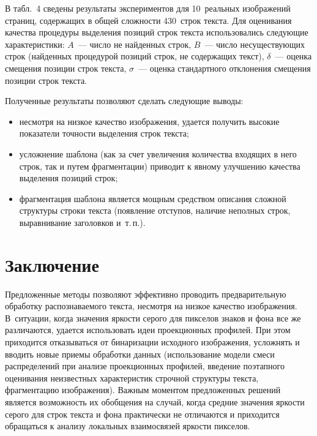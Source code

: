 \begin{multicols}{2}
      В табл.~4 сведены результаты экспериментов для 10~реальных изображений 
страниц, содержащих в общей сложности 430~строк текста. Для оценивания качества 
процедуры выделения позиций строк текста использовались следующие характеристики: 
$A$~--- число не найденных строк, $B$~--- число несуществующих строк (найденных 
процедурой позиций строк, не содержащих текст), $\delta$~--- оценка смещения позиции 
строк текста, $\sigma$~--- оценка стандартного отклонения смещения позиции строк 
текста. 
      
      Полученные результаты позволяют сделать следующие выводы:
      \begin{itemize}
\item несмотря на низкое качество изображения, удается получить высокие показатели 
точности выделения строк текста;
\item усложнение шаблона (как за счет увеличения количества входящих в него строк, 
так и путем фрагментации) приводит к явному улучшению качества выделения 
позиций строк;
\item фрагментация шаблона является мощным средством описания сложной 
структуры строки текста (появление отступов, наличие неполных строк, выравнивание 
заголовков и~т.\,п.).
\end{itemize}


\section{Заключение}
      
      Предложенные методы позволяют эффективно проводить предварительную 
обработку распознаваемого текста, несмотря на низкое качество изображения. 
В~ситуации, когда значения яркости серого для пикселов знаков и фона все же 
различаются, удается использовать идеи проекционных профилей. При этом приходится 
отказываться от бинаризации исходного изображения, усложнять и вводить новые приемы 
обработки данных (использование модели смеси распределений при анализе 
проекционных профилей, введение поэтапного оценивания неизвестных характеристик 
строчной структуры текста, фрагментацию изображения). Важным моментом 
предложенных решений является возможность их обобщения на случай, когда средние 
значения яркости серого для строк текста и фона практически не отличаются и 
приходится обращаться к анализу локальных взаимосвязей яркости пикселов. 

{\small\frenchspacing
{%
\begin{thebibliography}{9}
  

\end{thebibliography}}}
\end{multicols}
